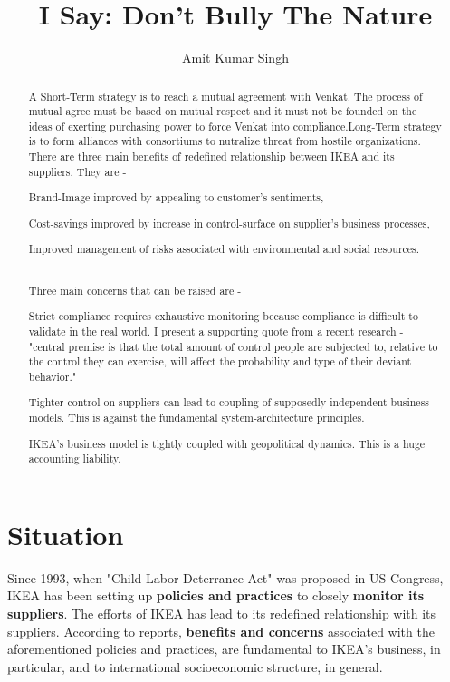 \documentclass[11pt, a4paper, margin=1in]{IEEEtran}
\begin{document}
\title{I Say: Don't Bully The Nature}
\author{Amit Kumar Singh}
\maketitle

\renewcommand{\abstractname}{Executive Summary}
\begin{abstract}
A Short-Term strategy is to reach a mutual agreement with Venkat. The process of mutual agree must be based on mutual respect and it must not be founded on the ideas of exerting purchasing power to force Venkat into compliance.Long-Term strategy is to form alliances with consortiums to nutralize threat from hostile organizations.\\
There are three main benefits of redefined relationship between IKEA and its suppliers. They are - \\
\begin{enumerate*}
 \item Brand-Image improved by appealing to customer's sentiments,
 \item Cost-savings improved by increase in control-surface on supplier's business processes,
 \item Improved management of risks associated with environmental and social resources.
\end{enumerate*} \\
Three main concerns that can be raised are - \\
\begin{enumerate*}
 \item Strict compliance requires exhaustive monitoring because compliance is difficult to validate in the real world. I present a supporting quote from a recent research - "central premise is that the total amount of control people are subjected to, relative to the control they can exercise, will affect the probability and type of their deviant behavior." \cite{tittle2018control}
 \item Tighter control on suppliers can lead to coupling of supposedly-independent business models. This is against the fundamental system-architecture principles.
 \item IKEA's business model is tightly coupled with geopolitical dynamics. This is a huge accounting liability.
\end{enumerate*}
\end{abstract}
\section{Situation}
Since 1993, when "Child Labor Deterrance Act" was proposed in US Congress, IKEA has been setting up \textbf{policies and practices} to closely \textbf{monitor its suppliers}. The efforts of IKEA has lead to its redefined relationship with its suppliers. According to reports, \textbf{benefits and concerns} associated with the aforementioned policies and practices, are fundamental to IKEA's business, in particular, and to international socioeconomic structure, in general.
\end{document}
